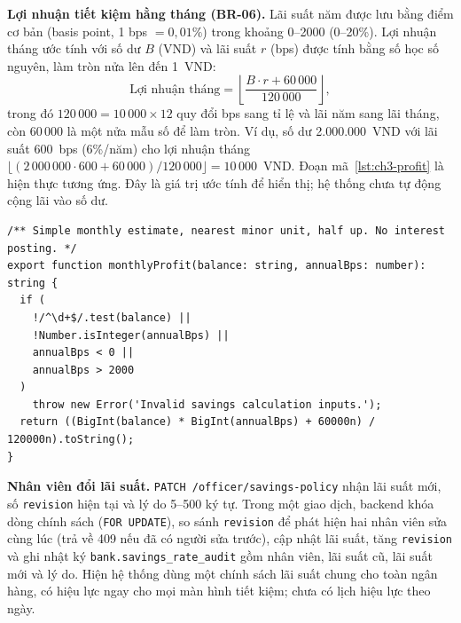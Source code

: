 \textbf{Lợi nhuận tiết kiệm hằng tháng (BR-06).} Lãi suất năm được lưu bằng điểm cơ bản (basis point, 1 bps $= 0{,}01\%$) trong khoảng 0--2000 (0--20\%). Lợi nhuận tháng ước tính với số dư $B$ (VND) và lãi suất $r$ (bps) được tính bằng số học số nguyên, làm tròn nửa lên đến 1~VND:
\begin{equation}
	\text{Lợi nhuận tháng} =\left\lfloor \frac{B \cdot r + 60\,000}{120\,000} \right\rfloor,
	\label{eq:ch3-monthly-profit}
\end{equation}
trong đó $120\,000 = 10\,000 \times 12$ quy đổi bps sang tỉ lệ và lãi năm sang lãi tháng, còn $60\,000$ là một nửa mẫu số để làm tròn. Ví dụ, số dư 2.000.000~VND với lãi suất 600~bps (6\%/năm) cho lợi nhuận tháng $\lfloor (2\,000\,000 \cdot 600 + 60\,000)/120\,000 \rfloor = 10\,000$~VND. Đoạn mã~\ref{lst:ch3-profit} là hiện thực tương ứng. Đây là giá trị ước tính để hiển thị; hệ thống chưa tự động cộng lãi vào số dư.

\begin{lstlisting}[caption={Tính lợi nhuận tiết kiệm hằng tháng (\texttt{backend/\allowbreak{}src/\allowbreak{}accounts/\allowbreak{}account-\allowbreak{}information.\allowbreak{}ts})},label={lst:ch3-profit}]
/** Simple monthly estimate, nearest minor unit, half up. No interest posting. */
export function monthlyProfit(balance: string, annualBps: number): string {
  if (
    !/^\d+$/.test(balance) ||
    !Number.isInteger(annualBps) ||
    annualBps < 0 ||
    annualBps > 2000
  )
    throw new Error('Invalid savings calculation inputs.');
  return ((BigInt(balance) * BigInt(annualBps) + 60000n) / 120000n).toString();
}
\end{lstlisting}

\textbf{Nhân viên đổi lãi suất.} \texttt{PATCH /\allowbreak{}officer/\allowbreak{}savings-\allowbreak{}policy} nhận lãi suất mới, số \texttt{revision} hiện tại và lý do 5--500 ký tự. Trong một giao dịch, backend khóa dòng chính sách (\texttt{FOR UPDATE}), so sánh \texttt{revision} để phát hiện hai nhân viên sửa cùng lúc (trả về 409 nếu đã có người sửa trước), cập nhật lãi suất, tăng \texttt{revision} và ghi nhật ký \texttt{bank.\allowbreak{}savings\_\allowbreak{}rate\_\allowbreak{}audit} gồm nhân viên, lãi suất cũ, lãi suất mới và lý do. Hiện hệ thống dùng một chính sách lãi suất chung cho toàn ngân hàng, có hiệu lực ngay cho mọi màn hình tiết kiệm; chưa có lịch hiệu lực theo ngày.

